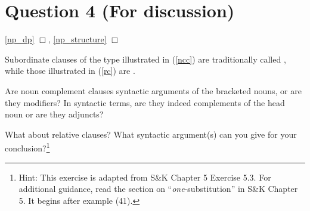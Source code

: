 \documentclass{article}
\begin{document}

\section*{Question 4 (For discussion)}%
\hfill{} \ref{np_dp} $\Box$,
\ref{np_structure} $\Box$%

Subordinate clauses of the type illustrated in (\ref{ncc}) are traditionally called , while those illustrated in (\ref{rc}) are .
\begin{exe}
    \label{ncc}
    \label{rc}
\end{exe}
Are noun complement clauses syntactic arguments of the bracketed nouns, or are they modifiers?
In syntactic terms, are they indeed complements of the head noun or are they adjuncts?

What about relative clauses?
What syntactic argument(s) can you give for your conclusion?\footnote{Hint: This exercise is adapted from S\&K Chapter 5 Exercise 5.3.
For additional guidance, read the section on ``\emph{one}-substitution'' in S\&K Chapter 5.
It begins after example (41).}
\end{document}
